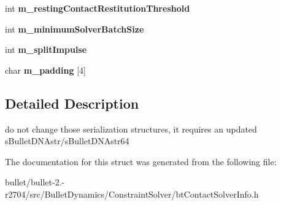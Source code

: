 \begin{DoxyCompactItemize}
\item 
\hypertarget{structbt_contact_solver_info_double_data_a8ac9a7b5204a42dbf5d4769b495ccb1c}{int {\bfseries m\+\_\+resting\+Contact\+Restitution\+Threshold}}\label{structbt_contact_solver_info_double_data_a8ac9a7b5204a42dbf5d4769b495ccb1c}

\item 
\hypertarget{structbt_contact_solver_info_double_data_a54f15f63e54d1f2cd0122b3aa9332124}{int {\bfseries m\+\_\+minimum\+Solver\+Batch\+Size}}\label{structbt_contact_solver_info_double_data_a54f15f63e54d1f2cd0122b3aa9332124}

\item 
\hypertarget{structbt_contact_solver_info_double_data_a5a08dd464049154fff27a9710c4bb925}{int {\bfseries m\+\_\+split\+Impulse}}\label{structbt_contact_solver_info_double_data_a5a08dd464049154fff27a9710c4bb925}

\item 
\hypertarget{structbt_contact_solver_info_double_data_ae9f2b5749146b575a49f61e4bc1b041a}{char {\bfseries m\+\_\+padding} \mbox{[}4\mbox{]}}\label{structbt_contact_solver_info_double_data_ae9f2b5749146b575a49f61e4bc1b041a}

\end{DoxyCompactItemize}


\subsection{Detailed Description}
do not change those serialization structures, it requires an updated s\+Bullet\+D\+N\+Astr/s\+Bullet\+D\+N\+Astr64 

The documentation for this struct was generated from the following file\+:\begin{DoxyCompactItemize}
\item 
bullet/bullet-\/2.-\/r2704/src/\+Bullet\+Dynamics/\+Constraint\+Solver/bt\+Contact\+Solver\+Info.\+h\end{DoxyCompactItemize}

